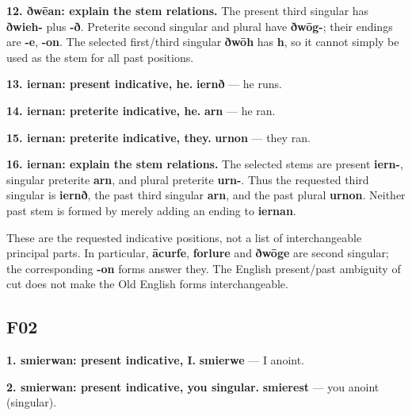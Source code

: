 \textbf{12. ðwēan: explain the stem relations.} The present third singular has \textbf{ðwieh-} plus \textbf{-ð}. Preterite second singular and plural have \textbf{ðwōg-}; their endings are \textbf{-e}, \textbf{-on}. The selected first/\allowbreak{}third singular \textbf{ðwōh} has \textbf{h}, so it cannot simply be used as the stem for all past positions.

\textbf{13. iernan: present indicative, he.} \textbf{iernð} — he runs.

\textbf{14. iernan: preterite indicative, he.} \textbf{arn} — he ran.

\textbf{15. iernan: preterite indicative, they.} \textbf{urnon} — they ran.

\textbf{16. iernan: explain the stem relations.} The selected stems are present \textbf{iern-}, singular preterite \textbf{arn}, and plural preterite \textbf{urn-}. Thus the requested third singular is \textbf{iernð}, the past third singular \textbf{arn}, and the past plural \textbf{urnon}. Neither past stem is formed by merely adding an ending to \textbf{iernan}.

These are the requested indicative positions, not a list of interchangeable principal parts. In particular, \textbf{ācurfe}, \textbf{forlure} and \textbf{ðwōge} are second singular; the corresponding \textbf{-on} forms answer they. The English present/\allowbreak{}past ambiguity of cut does not make the Old English forms interchangeable.

\subsection*{F02}

\textbf{1. smierwan: present indicative, I.} \textbf{smierwe} — I anoint.

\textbf{2. smierwan: present indicative, you singular.} \textbf{smierest} — you anoint (singular).

